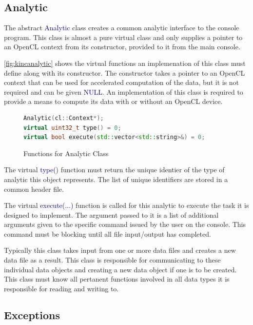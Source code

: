\documentclass[10pt]{article}
\providecommand{\h}[1]{\textcolor{darkblue}{#1}}
\begin{document}
\subsection{Analytic}

The abstract \h{Analytic} class creates a common analytic interface to the 
console program. This class is almost a pure virtual class and only supplies a 
pointer to an OpenCL context from its constructor, provided to it from the main 
console.

\autoref{fig:kincanalytic} shows the virtual functions an implemenation of this 
class must define along with its constructor. The constructor takes a pointer 
to an OpenCL context that can be used for accelerated computation of the data, 
but it is not required and can be given \h{NULL}. An implementation of this 
class is required to provide a means to compute its data with or without an 
OpenCL device.

\begin{figure}[H]
\begin{mdframed}[style=functions]
\begin{lstlisting}[language=C++]
Analytic(cl::Context*);
virtual uint32_t type() = 0;
virtual bool execute(std::vector<std::string>&) = 0;
\end{lstlisting}
\end{mdframed}
\caption{Functions for Analytic Class}
\label{fig:kincanalytic}
\end{figure}

The virtual \h{type()} function must return the unique identier of the type of 
analytic this object represents. The list of unique identifiers are stored in a 
common header file.

The virtual \h{execute(...)} function is called for this analytic to execute 
the task it is designed to implement. The argument passed to it is a list of 
additional arguments given to the specific command issued by the user on the 
console. This command must be blocking until all file input/output has 
completed.

Typically this class takes input from one or more data files and creates a new 
data file as a result. This class is responsible for communicating to these 
individual data objects and creating a new data object if one is to be created. 
This class must know all pertanent functions involved in all data types it is 
responsible for reading and writing to.

\subsection{Exceptions}
\end{document}
